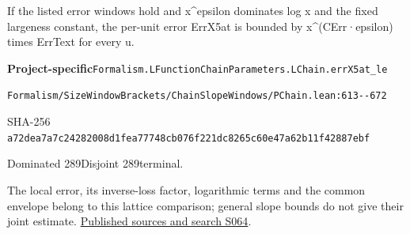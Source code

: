 
\begin{formalstatement}[D567]\label{decomp:D567}
If the listed error windows hold and x\textasciicircum{}epsilon dominates log x and the fixed largeness constant, the per-unit error ErrX5at is bounded by x\textasciicircum{}(CErr·epsilon) times ErrText for every u.
\end{formalstatement}
{\small\raggedright\noindent\textsf{\bfseries Project-specific}\quad \nolinkurl{Formalism.LFunctionChainParameters.LChain.errX5at_le}\par\noindent \nolinkurl{Formalism/SizeWindowBrackets/ChainSlopeWindows/PChain.lean:613--672}\par\noindent SHA-256 \nolinkurl{a72dea7a7c24282008d1fea77748cb076f221dc8265c60e47a62b11f42887ebf}\par\noindent Dominated 289\quad Disjoint 289\quad terminal.\par}
The local error, its inverse-loss factor, logarithmic terms and the common envelope belong to this lattice comparison; general slope bounds do not give their joint estimate.
\hyperref[lit:S064]{Published sources and search S064}.
